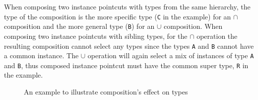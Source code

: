 \documentclass{acm_proc_article-sp}
\newcommand{\lstinln}[1]{\lstinline~#1~}
\begin{document}
When composing two instance pointcuts with types from the same hierarchy, the type of the composition is the more specific type (\lstinln{C} in the example) for an $\cap$ composition and the more general type (\lstinln{B}) for an $\cup$ composition.
When composing two instance pointcuts with sibling types, for the $\cap$ operation the resulting composition cannot select any types since the types \lstinln{A} and \lstinln{B} cannot have a common instance. The $\cup$ operation will again select a mix of instances of type \lstinln{A} and \lstinln{B}, thus composed instance pointcut must have the common super type, \lstinln{R} in the example.



\begin{figure}%
\centering
{}
\hspace{40pt}
\vspace{10pt}
\caption{An example to illustrate composition's effect on types}
\label{fig:compotypes}
\end{figure}
\end{document}
